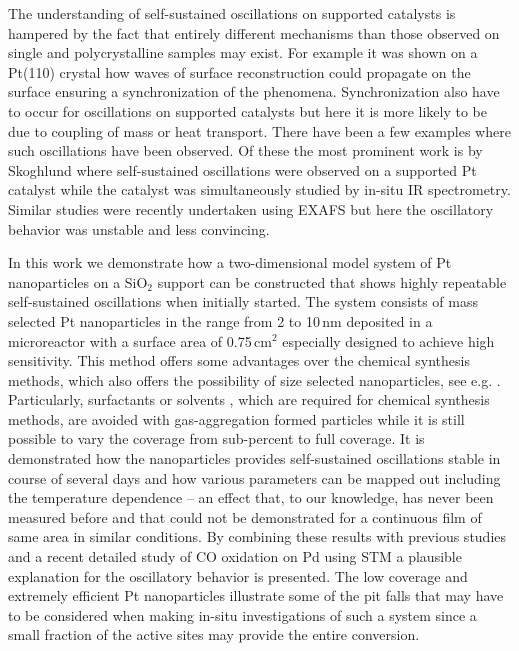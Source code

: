 \documentclass[journal=jacsat,manuscript=article]{achemso}
\begin{document}
The understanding of self-sustained oscillations on supported
catalysts is hampered by the fact that entirely different mechanisms than those
observed on single and polycrystalline samples may exist. For example it was
shown on a Pt(110) crystal how waves of surface reconstruction could propagate
on the surface ensuring a synchronization of the phenomena. Synchronization also have to
occur for oscillations on supported catalysts but here it is more likely to be
due to coupling of mass or heat transport. There have been a few examples where
such oscillations have been observed. Of these the most prominent work is by
Skoghlund\cite{Carlsson2006} where self-sustained oscillations were observed on
a supported Pt catalyst while the catalyst was simultaneously studied by in-situ
IR spectrometry. Similar studies were recently undertaken using EXAFS
\cite{Singh2010} but here the oscillatory behavior was unstable and less
convincing.

In this work we demonstrate how a two-dimensional model system of Pt
nanoparticles on a SiO$_2$ support can be constructed that shows highly
repeatable self-sustained oscillations when initially started. The system
consists of mass selected Pt nanoparticles in the range from 2 to 10\,nm 
deposited in a microreactor with a surface area of 0.75\,cm$^2$
especially designed to achieve high sensitivity\cite{Henriksen2009}. This
method offers some advantages over the chemical synthesis methods, which also
offers the possibility of size selected nanoparticles, see e.g.
\cite{Tsang2008,Shao2011}. Particularly, surfactants or solvents
\cite{Biacchi2011}, which are required for
chemical synthesis methods, are avoided with gas-aggregation formed particles
while it is still possible to vary the coverage from sub-percent to full coverage.
It is demonstrated how the nanoparticles provides self-sustained
oscillations stable in course of several days and how various parameters can be mapped out
including the temperature dependence -- an effect that, to our knowledge, has
never been measured before and that could
not be demonstrated for a continuous film of same area in similar conditions.
By combining these results with previous studies \cite{Carlsson2006,Singh2010}
and a recent detailed study of CO oxidation on Pd using STM
\cite{Hendriksen2010} a plausible explanation for the oscillatory behavior is
presented. The low coverage and extremely efficient Pt nanoparticles illustrate
some of the pit falls that may have to be considered when making in-situ
investigations of such a system since a small fraction of the active sites may provide the
entire conversion.
\end{document}
